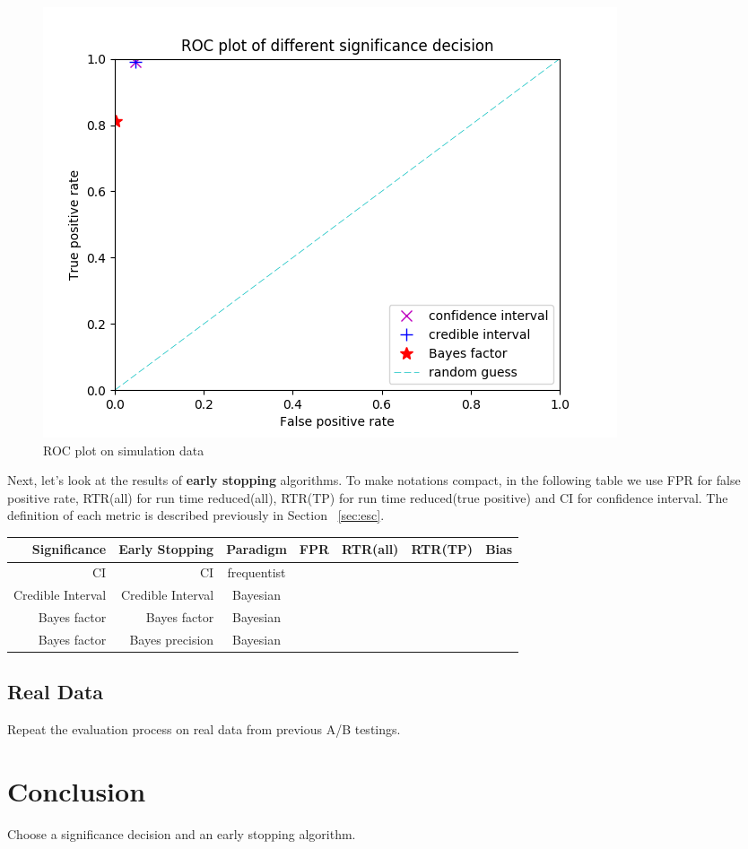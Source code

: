 \documentclass[paper=a4, fontsize=11pt]{scrartcl} %
\numberwithin{equation}{section} %
\numberwithin{figure}{section} %
\numberwithin{table}{section} %
\begin{document}
\begin{figure} 
\centering
\includegraphics[scale=.6]{roc_sim_data.png}
\caption{ROC plot on simulation data}
\label{fig:roc_sim_data}
\end{figure}

Next, let's look at the results of \textbf{early stopping} algorithms. To make notations compact, in the following table we use FPR for false positive rate, RTR(all) for run time reduced(all), RTR(TP) for run time reduced(true positive) and CI for confidence interval. The definition of each metric is described previously in Section ~\ref{sec:esc}.

\begin{center}
  \begin{tabular}{ | r | r | c | c | c | c | c | }
    \hline
    \textbf{Significance} & \textbf{Early Stopping}  & \textbf{Paradigm} & \textbf{FPR} & \textbf{RTR(all)} & \textbf{RTR(TP)} & \textbf{Bias} \\ \hline\hline
    CI &  CI & frequentist & & &  &  \\ \hline
    Credible Interval & Credible Interval & Bayesian &  & &  &  \\ \hline
    Bayes factor & Bayes factor & Bayesian & & &  &  \\ \hline
    Bayes factor & Bayes precision & Bayesian &  & &  &  \\ \hline
  \end{tabular}
\end{center}


\subsection{Real Data}
Repeat the evaluation process on real data from previous A/B testings.

\section{Conclusion}
Choose a significance decision and an early stopping algorithm.

\end{document}
